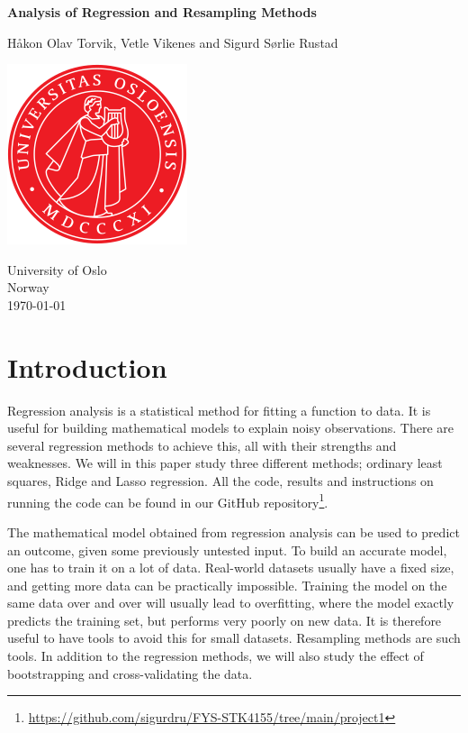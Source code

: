 \documentclass[reprint,english,notitlepage,aps,nobalancelastpage,nofootinbib]{revtex4-1}  %
\begin{document}
\begin{titlepage}
	\begin{center}
	\textbf{Analysis of Regression and Resampling Methods}

	\vspace{0.2cm}
	Håkon Olav Torvik, Vetle Vikenes and Sigurd Sørlie Rustad

	\vspace{0.5cm}
	\includegraphics[scale=0.5]{../../pictures/UIO}
	\vspace{0.8cm}

	University of Oslo\\
	Norway\\
	\today	\\
	\end{center}
	\tableofcontents
	\clearpage
\end{titlepage}

\onecolumngrid
\section*{Introduction}

Regression analysis is a statistical method for fitting a function to data. It is useful for building mathematical models to explain noisy observations. There are several regression methods to achieve this, all with their strengths and weaknesses. We will in this paper study three different methods; ordinary least squares, Ridge and Lasso regression. All the code, results and instructions on running the code can be found in our GitHub repository\footnote{\href{https://github.com/sigurdru/FYS-STK4155/tree/main/project1}{https://github.com/sigurdru/FYS-STK4155/tree/main/project1}}.

The mathematical model obtained from regression analysis can be used to predict an outcome, given some previously untested input. To build an accurate model, one has to train it on a lot of data. Real-world datasets usually have a fixed size, and getting more data can be practically impossible. Training the model on the same data over and over will usually lead to overfitting, where the model exactly predicts the training set, but performs very poorly on new data. It is therefore useful to have tools to avoid this for small datasets. Resampling methods are such tools. In addition to the regression methods, we will also study the effect of bootstrapping and cross-validating the data.
\end{document}
